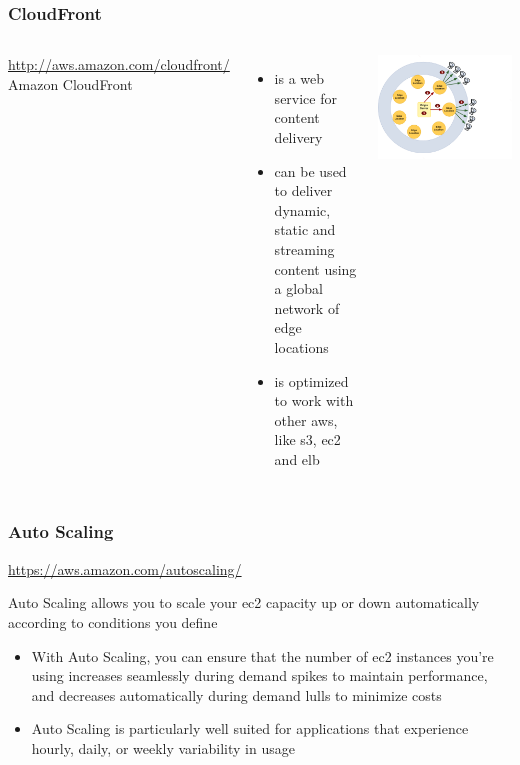 \documentclass{beamer}
\begin{document}
\begin{frame}
\frametitle[CloudFront]{CloudFront}
\begin{columns}
\url{http://aws.amazon.com/cloudfront/}
 Amazon CloudFront
\begin{itemize}
  \item is a web service for content delivery
  \item can be used to deliver dynamic, static and streaming content using a global network of edge locations
  \item is optimized to work with other \Gls{aws}, like \gls{s3}, \gls{ec2} and \gls{elb}
\end{itemize}
\includegraphics[width= 1.4 \textwidth]{cloudfront.eps}
\end{columns}
\end{frame}
\begin{frame}
\frametitle[Auto Scaling]{Auto Scaling}
\url{https://aws.amazon.com/autoscaling/}

Auto Scaling allows you to scale your \gls{ec2} capacity up or down automatically according to conditions you define
\begin{itemize}
\item With Auto Scaling, you can ensure that the number of \gls{ec2} instances you’re using increases seamlessly during demand spikes to maintain performance, and decreases automatically during demand lulls to minimize costs
\item Auto Scaling is particularly well suited for applications that experience hourly, daily, or weekly variability in usage
\end{itemize}
\end{frame}
\end{document}
